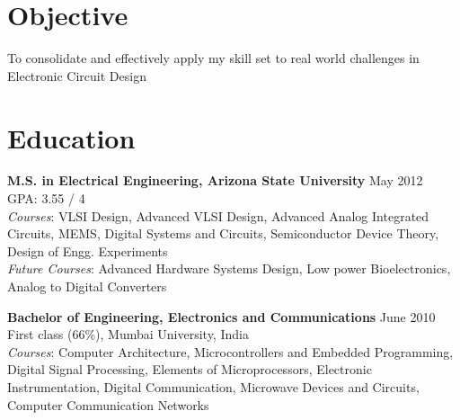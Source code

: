 \documentclass[margin]{res}
\begin{document}
\vspace*{-0.5in}


\address{ \textit{email}: ssridh14@asu.edu\\ \textit{phone}:  +1 (480) 327-7224}

\begin{resume} 

\section{Objective}
To consolidate and effectively apply my skill set to real world challenges in Electronic Circuit Design

\section{Education}
{\bf M.S. in Electrical Engineering, Arizona State University} \hfill  May 2012\\
GPA: 3.55 / 4\\
\textit{Courses}: VLSI Design, Advanced VLSI Design, Advanced Analog Integrated Circuits, MEMS, Digital Systems and Circuits, Semiconductor Device Theory, Design of Engg. Experiments\\
\textit{Future Courses}: Advanced Hardware Systems Design, Low power Bioelectronics, Analog to Digital Converters

\vspace{-0.2in}
{\bf Bachelor of Engineering, Electronics and Communications}  \hfill June 2010\\
First class (66\%), Mumbai University, India\\
\textit{Courses}: Computer Architecture, Microcontrollers and Embedded Programming, Digital Signal Processing, Elements of Microprocessors, Electronic Instrumentation, Digital Communication, Microwave Devices and Circuits, Computer Communication Networks


\end{resume}
\end{document}
